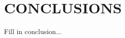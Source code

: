 \documentclass[a4paper,10pt]{article}
\begin{document}
	
	
	


\newpage
\section{CONCLUSIONS}

Fill in conclusion...






\end{document}
